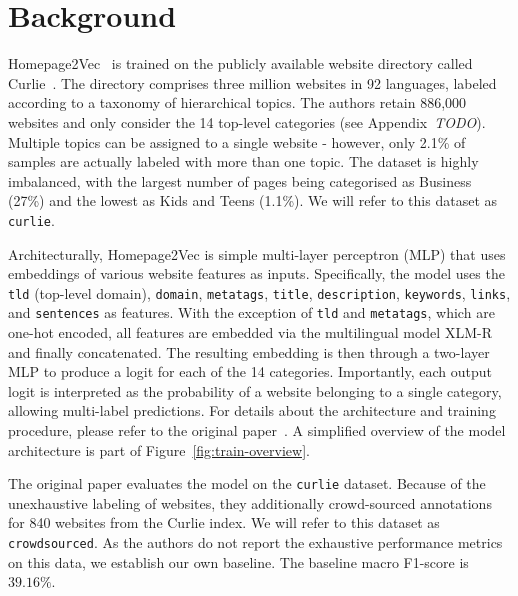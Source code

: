 \section{Background}\label{sec:background}

Homepage2Vec~\cite{homepage2vec} is trained on the publicly available website directory called Curlie~\cite{curlie}. The directory comprises three million websites in 92 languages, labeled according to a taxonomy of hierarchical topics. The authors retain 886,000 websites and only consider the 14 top-level categories (see Appendix~\textit{TODO}). Multiple topics can be assigned to a single website - however, only 2.1\% of samples are actually labeled with more than one topic. The dataset is highly imbalanced, with the largest number of pages being categorised as Business (27\%) and the lowest as Kids and Teens (1.1\%). We will refer to this dataset as \texttt{curlie}.


Architecturally, Homepage2Vec is simple multi-layer perceptron (MLP) that uses embeddings of various website features as inputs.
Specifically, the model uses the \texttt{tld} (top-level domain), \texttt{domain}, \texttt{metatags}, \texttt{title}, \texttt{description}, \texttt{keywords}, \texttt{links}, and \texttt{sentences} as features. With the exception of \texttt{tld} and \texttt{metatags}, which are one-hot encoded, all features are embedded via the multilingual model XLM-R~\cite{xmlr} and finally concatenated. The resulting embedding is then through a two-layer MLP to produce a logit for each of the 14 categories. Importantly, each output logit is interpreted as the probability of a website belonging to a single category, allowing multi-label predictions. For details about the architecture and training procedure, please refer to the original paper~\cite{homepage2vec}. A simplified overview of the model architecture is part of Figure~\ref{fig:train-overview}.

The original paper evaluates the model on the \texttt{curlie} dataset. Because of the unexhaustive labeling of websites, they additionally crowd-sourced annotations for 840 websites from the Curlie index. We will refer to this dataset as \texttt{crowdsourced}. As the authors do not report the exhaustive performance metrics on this data, we establish our own baseline. The baseline macro F1-score is $39.16\%$. 


